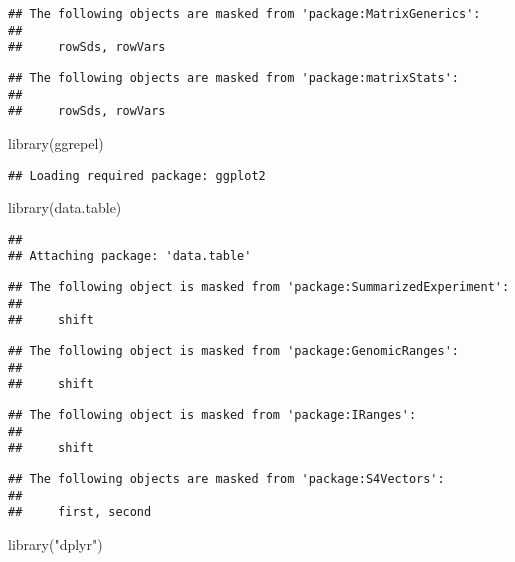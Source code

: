\documentclass[
]{article}
\newenvironment{Shaded}{\begin{snugshade}}{\end{snugshade}}
\newcommand{\FunctionTok}[1]{\textcolor[rgb]{0.00,0.00,0.00}{#1}}
\newcommand{\NormalTok}[1]{#1}
\newcommand{\StringTok}[1]{\textcolor[rgb]{0.31,0.60,0.02}{#1}}
\begin{document}
\begin{verbatim}
## The following objects are masked from 'package:MatrixGenerics':
## 
##     rowSds, rowVars
\end{verbatim}

\begin{verbatim}
## The following objects are masked from 'package:matrixStats':
## 
##     rowSds, rowVars
\end{verbatim}

\begin{Shaded}
\begin{Highlighting}[]
\FunctionTok{library}\NormalTok{(ggrepel)}
\end{Highlighting}
\end{Shaded}

\begin{verbatim}
## Loading required package: ggplot2
\end{verbatim}

\begin{Shaded}
\begin{Highlighting}[]
\FunctionTok{library}\NormalTok{(data.table)}
\end{Highlighting}
\end{Shaded}

\begin{verbatim}
## 
## Attaching package: 'data.table'
\end{verbatim}

\begin{verbatim}
## The following object is masked from 'package:SummarizedExperiment':
## 
##     shift
\end{verbatim}

\begin{verbatim}
## The following object is masked from 'package:GenomicRanges':
## 
##     shift
\end{verbatim}

\begin{verbatim}
## The following object is masked from 'package:IRanges':
## 
##     shift
\end{verbatim}

\begin{verbatim}
## The following objects are masked from 'package:S4Vectors':
## 
##     first, second
\end{verbatim}

\begin{Shaded}
\begin{Highlighting}[]
\FunctionTok{library}\NormalTok{(}\StringTok{"dplyr"}\NormalTok{)}
\end{Highlighting}
\end{Shaded}
\end{document}
